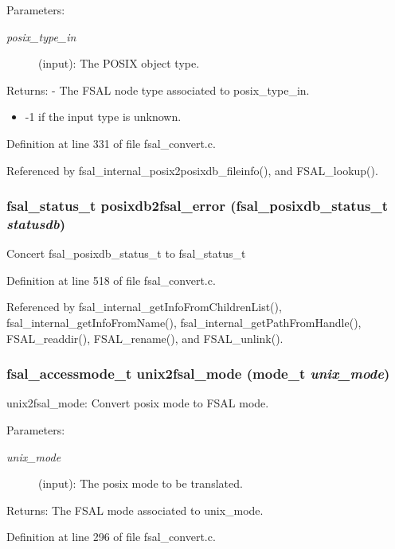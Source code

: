 \begin{Desc}
\item[Parameters:]
\begin{description}
\item[{\em posix\_\-type\_\-in}](input): The POSIX object type.\end{description}
\end{Desc}
\begin{Desc}
\item[Returns:]- The FSAL node type associated to posix\_\-type\_\-in.\begin{itemize}
\item -1 if the input type is unknown. \end{itemize}
\end{Desc}


Definition at line 331 of file fsal\_\-convert.c.

Referenced by fsal\_\-internal\_\-posix2posixdb\_\-fileinfo(), and FSAL\_\-lookup().
\subsubsection{\setlength{\rightskip}{0pt plus 5cm}fsal\_\-status\_\-t posixdb2fsal\_\-error (fsal\_\-posixdb\_\-status\_\-t {\em statusdb})}\label{fsal__convert_8c_a12}


Concert fsal\_\-posixdb\_\-status\_\-t to fsal\_\-status\_\-t 

Definition at line 518 of file fsal\_\-convert.c.

Referenced by fsal\_\-internal\_\-get\-Info\-From\-Children\-List(), fsal\_\-internal\_\-get\-Info\-From\-Name(), fsal\_\-internal\_\-get\-Path\-From\-Handle(), FSAL\_\-readdir(), FSAL\_\-rename(), and FSAL\_\-unlink().
\subsubsection{\setlength{\rightskip}{0pt plus 5cm}fsal\_\-accessmode\_\-t unix2fsal\_\-mode (mode\_\-t {\em unix\_\-mode})}\label{fsal__convert_8c_a6}


unix2fsal\_\-mode: Convert posix mode to FSAL mode.

\begin{Desc}
\item[Parameters:]
\begin{description}
\item[{\em unix\_\-mode}](input): The posix mode to be translated.\end{description}
\end{Desc}
\begin{Desc}
\item[Returns:]The FSAL mode associated to unix\_\-mode. \end{Desc}


Definition at line 296 of file fsal\_\-convert.c.